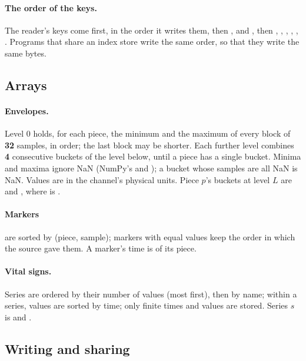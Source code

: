\paragraph{The order of the keys.} The reader's keys come first, in the order it writes them, then
,  and , then , , ,
, , . Programs that share an index store write
the same order, so that they write the same bytes.

\subsection{Arrays}
\label{sec:formats-reference-arrays}

\paragraph{Envelopes.} Level 0 holds, for each piece, the minimum and the maximum of every block of
\textbf{32} samples, in order; the last block may be shorter. Each further level combines
\textbf{4} consecutive buckets of the level below, until a piece has a single bucket. Minima and
maxima ignore NaN (NumPy's  and ); a bucket whose samples are all NaN is
NaN. Values are in the channel's physical units. Piece $p$'s buckets at level $L$ are
 and , where \code{[o, len]} is
.

\paragraph{Markers} are sorted by (piece, sample); markers with equal values keep the order in
which the source gave them. A marker's time is  of its piece.

\paragraph{Vital signs.} Series are ordered by their number of values (most first), then by name;
within a series, values are sorted by time; only finite times and values are stored. Series $s$ is
 and .

\subsection{Writing and sharing}
\label{sec:formats-reference-writing}


